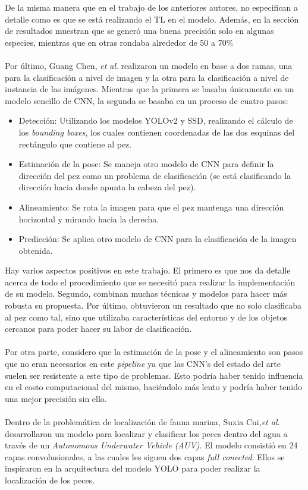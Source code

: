 De la misma manera que en el trabajo de los anteriores autores, no especifican a detalle como es que se está realizando el TL en el modelo. Además, en la sección de resultados muestran que se generó una buena precisión solo en algunas especies, mientras que en otras rondaba alrededor de 50 a 70\% \\\\
Por último, Guang Chen, \textit{et al}. \cite{8371919} realizaron un modelo en base a dos ramas, una para la clasificación a nivel de imagen y la otra para la clasificación a nivel de instancia de las imágenes. Mientras que la primera se basaba únicamente en un modelo sencillo de CNN, la segunda se basaba en un proceso de cuatro pasos:
\begin{itemize}
    \item Detección: Utilizando los modelos YOLOv2 y SSD, realizando el cálculo de los \textit{bounding boxes}, los cuales contienen coordenadas de las dos esquinas del rectángulo que contiene al pez.
    \item Estimación de la pose: Se maneja otro modelo de CNN para definir la dirección del pez como un problema de clasificación (se está clasificando la dirección hacia donde apunta la cabeza del pez).
    \item Alineamiento: Se rota la imagen para que el pez mantenga una dirección horizontal y mirando hacia la derecha.
    \item Predicción: Se aplica otro modelo de CNN para la clasificación de la imagen obtenida.
\end{itemize}
Hay varios aspectos positivos en este trabajo. El primero es que nos da detalle acerca de todo el procedimiento que se necesitó para realizar la implementación de su modelo. Segundo, combinan muchas técnicas y modelos para hacer más robusta su propuesta. Por último, obtuvieron un resultado que no solo clasificaba al pez como tal, sino que utilizaba características del entorno y de los objetos cercanos para poder hacer su labor de clasificación. \\\\
Por otra parte, considero que la estimación de la pose y el alineamiento son pasos que no eran necesarios en este \textit{pipeline} ya que las CNN's del estado del arte suelen ser resistente a este tipo de problemas. Esto podría haber tenido influencia en el costo computacional del mismo, haciéndolo más lento y podría haber tenido una mejor precisión sin ello. \\\\
Dentro de la problemática de localización de fauna marina, Suxia Cui,\textit{et al}.\cite{Cui2020} desarrollaron un modelo para localizar y clasificar los peces dentro del agua a través de un \textit{Autonomous Underwater Vehicle (AUV)}. El modelo consistió en 24 capas convolusionales, a las cuales les siguen dos capas \textit{full conected}. Ellos se inspiraron en la arquitectura del modelo YOLO para poder realizar la localización de los peces.\\\\

